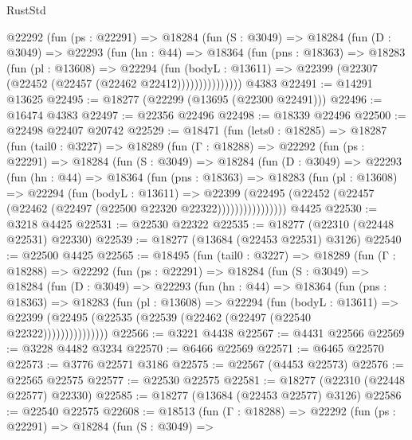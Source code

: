 \begin{lexlean}{RustStd}
\begin{coremodule}
          @22292
            (fun (ps : @22291) =>
            @18284
              (fun (S : @3049) =>
              @18284
                (fun (D : @3049) =>
                @22293
                  (fun (hn : @44) =>
                  @18364
                    (fun (pns : @18363) =>
                    @18283
                      (fun (pl : @13608) =>
                      @22294
                        (fun (bodyL : @13611) =>
                        @22399 (@22307 (@22452 (@22457 (@22462 @22412)))))))))))))))
    @4383
@22491 := @14291 @13625
@22495 := @18277 (@22299 (@13695 (@22300 @22491)))
@22496 := @16474 @4383
@22497 := @22356 @22496
@22498 := @18339 @22496
@22500 := @22498 @22407 @20742
@22529 := @18471
    (fun (lets0 : @18285) =>
    @18287
      (fun (tail0 : @3227) =>
      @18289
        (fun (Γ : @18288) =>
        @22292
          (fun (ps : @22291) =>
          @18284
            (fun (S : @3049) =>
            @18284
              (fun (D : @3049) =>
              @22293
                (fun (hn : @44) =>
                @18364
                  (fun (pns : @18363) =>
                  @18283
                    (fun (pl : @13608) =>
                    @22294
                      (fun (bodyL : @13611) =>
                      @22399
                        (@22495
                          (@22452 (@22457 (@22462 (@22497 (@22500 @22320 @22322))))))))))))))))
    @4425
@22530 := @3218 @4425
@22531 := @22530 @22322
@22535 := @18277 (@22310 (@22448 @22531) @22330)
@22539 := @18277 (@13684 (@22453 @22531) @3126)
@22540 := @22500 @4425
@22565 := @18495
    (fun (tail0 : @3227) =>
    @18289
      (fun (Γ : @18288) =>
      @22292
        (fun (ps : @22291) =>
        @18284
          (fun (S : @3049) =>
          @18284
            (fun (D : @3049) =>
            @22293
              (fun (hn : @44) =>
              @18364
                (fun (pns : @18363) =>
                @18283
                  (fun (pl : @13608) =>
                  @22294
                    (fun (bodyL : @13611) =>
                    @22399 (@22495 (@22535 (@22539 (@22462 (@22497 (@22540 @22322)))))))))))))))
@22566 := @3221 @4438
@22567 := @4431 @22566
@22569 := @3228 @4482 @3234
@22570 := @6466 @22569
@22571 := @6465 @22570
@22573 := @3776 @22571 @3186
@22575 := @22567 (@4453 @22573)
@22576 := @22565 @22575
@22577 := @22530 @22575
@22581 := @18277 (@22310 (@22448 @22577) @22330)
@22585 := @18277 (@13684 (@22453 @22577) @3126)
@22586 := @22540 @22575
@22608 := @18513
    (fun (Γ : @18288) =>
    @22292
      (fun (ps : @22291) =>
      @18284
        (fun (S : @3049) =>

\end{coremodule}
\end{lexlean}
